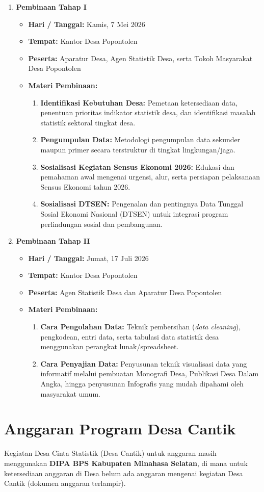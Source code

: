 \begin{enumerate}[label=\textbf{\arabic*.}]
  \item \textbf{Pembinaan Tahap I}
  \begin{itemize}
    \item \textbf{Hari / Tanggal:} Kamis, 7 Mei 2026
    \item \textbf{Tempat:} Kantor Desa Popontolen
    \item \textbf{Peserta:} Aparatur Desa, Agen Statistik Desa, serta Tokoh Masyarakat Desa Popontolen
    \item \textbf{Materi Pembinaan:}
    \begin{enumerate}[label=\arabic*.]
      \item \textbf{Identifikasi Kebutuhan Desa:} Pemetaan ketersediaan data, penentuan prioritas indikator statistik desa, dan identifikasi masalah statistik sektoral tingkat desa.
      \item \textbf{Pengumpulan Data:} Metodologi pengumpulan data sekunder maupun primer secara terstruktur di tingkat lingkungan/jaga.
      \item \textbf{Sosialisasi Kegiatan Sensus Ekonomi 2026:} Edukasi dan pemahaman awal mengenai urgensi, alur, serta persiapan pelaksanaan Sensus Ekonomi tahun 2026.
      \item \textbf{Sosialisasi DTSEN:} Pengenalan dan pentingnya Data Tunggal Sosial Ekonomi Nasional (DTSEN) untuk integrasi program perlindungan sosial dan pembangunan.
    \end{enumerate}
  \end{itemize}

  \item \textbf{Pembinaan Tahap II}
  \begin{itemize}
    \item \textbf{Hari / Tanggal:} Jumat, 17 Juli 2026
    \item \textbf{Tempat:} Kantor Desa Popontolen
    \item \textbf{Peserta:} Agen Statistik Desa dan Aparatur Desa Popontolen
    \item \textbf{Materi Pembinaan:}
    \begin{enumerate}[label=\arabic*.]
      \item \textbf{Cara Pengolahan Data:} Teknik pembersihan (\textit{data cleaning}), pengkodean, entri data, serta tabulasi data statistik desa menggunakan perangkat lunak/spreadsheet.
      \item \textbf{Cara Penyajian Data:} Penyusunan teknik visualisasi data yang informatif melalui pembuatan Monografi Desa, Publikasi Desa Dalam Angka, hingga penyusunan Infografis yang mudah dipahami oleh masyarakat umum.
    \end{enumerate}
  \end{itemize}
\end{enumerate}

\section{Anggaran Program Desa Cantik}

Kegiatan Desa Cinta Statistik (Desa Cantik) untuk anggaran masih menggunakan \textbf{DIPA BPS Kabupaten Minahasa Selatan}, di mana untuk ketersediaan anggaran di Desa belum ada anggaran mengenai kegiatan Desa Cantik (dokumen anggaran terlampir).
